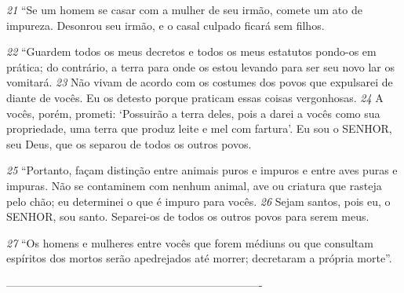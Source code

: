 \smallskip
\textit{\tiny 21}
“Se um homem se casar com a mulher de seu irmão, comete um ato de
impureza. Desonrou seu irmão, e o casal culpado ficará sem filhos.
   
\smallskip
\textit{\tiny 22}
“Guardem todos os meus decretos e todos os meus estatutos pondo-os em
prática; do contrário, a terra para onde os estou levando para ser seu novo lar os
vomitará. 
\textit{\tiny 23}
Não vivam de acordo com os costumes dos povos que expulsarei de
diante de vocês. Eu os detesto porque praticam essas coisas vergonhosas. 
\textit{\tiny 24}
A
vocês, porém, prometi: ‘Possuirão a terra deles, pois a darei a vocês como sua
propriedade, uma terra que produz leite e mel com fartura’. Eu sou o SENHOR, seu
Deus, que os separou de todos os outros povos.
   
\smallskip
\textit{\tiny 25}
“Portanto, façam distinção entre animais puros e impuros e entre aves puras
e impuras. Não se contaminem com nenhum animal, ave ou criatura que rasteja
pelo chão; eu determinei o que é impuro para vocês. 
\textit{\tiny 26}
Sejam santos, pois eu, o
SENHOR, sou santo. Separei-os de todos os outros povos para serem meus.
  
\smallskip
\textit{\tiny 27}
“Os homens e mulheres entre vocês que forem médiuns ou que consultam
espíritos dos mortos serão apedrejados até morrer; decretaram a própria morte”.

----------------------------------------------------------------------
